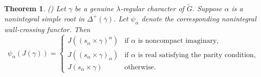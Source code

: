 \documentclass{amsart}
\newtheorem{thm}{Theorem}[section]
\theoremstyle{definition}
\begin{document}
\begin{thm}\label{t:transfun}
\emph{(\cite[Theorem 5.3]{RT05})}
Let $\gamma$ be a genuine $\lambda$-regular character of $\widetilde G$. Suppose $\alpha$ is a nonintegral simple root in $\Delta^+(\overline\gamma)$. Let $\psi_\alpha$ denote the corresponding nonintegral wall-crossing functor. Then
\begin{equation*}
\psi_\alpha(J(\gamma))
=
\begin{cases}
J((s_\alpha\times\gamma)^\alpha)
& \text{if $\alpha$ is noncompact imaginary,} \\
J((s_\alpha\times\gamma)_\alpha)
& \text{if $\alpha$ is real satisfying the parity condition,} \\
J(s_\alpha\times\gamma)
& \text{otherwise.}
\end{cases}
\end{equation*}
\end{thm}
\end{document}
